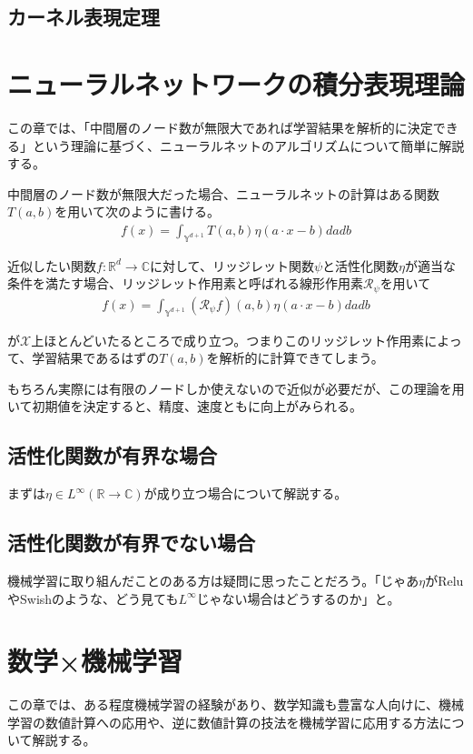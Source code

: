 \documentclass[dvipdfmx, a4paper]{jsarticle}
\begin{document}
\subsection{カーネル表現定理}





\newpage
\section{ニューラルネットワークの積分表現理論}
この章では、「中間層のノード数が無限大であれば学習結果を解析的に決定できる」という理論に基づく、ニューラルネットのアルゴリズムについて簡単に解説する。

中間層のノード数が無限大だった場合、ニューラルネットの計算はある関数$T(a,b)$を用いて次のように書ける。
\begin{align}
f(x)=\int_{\mathbb{Y}^{d+1}}T(a,b)\eta(a\cdot x-b)dadb 
\end{align}

近似したい関数$f:\mathbb{R}^d\to\mathbb{C}$に対して、リッジレット関数$\psi$と活性化関数$\eta$が適当な条件を満たす場合、リッジレット作用素と呼ばれる線形作用素$\mathcal{R}_\psi$を用いて
\begin{align}
f(x)=\int_{\mathbb{Y}^{d+1}}(\mathcal{R}_\psi f)(a,b)\eta(a\cdot x-b)dadb
\end{align}

が$\mathcal{X}$上ほとんどいたるところで成り立つ。つまりこのリッジレット作用素によって、学習結果であるはずの$T(a,b)$を解析的に計算できてしまう。

もちろん実際には有限のノードしか使えないので近似が必要だが、この理論を用いて初期値を決定すると、精度、速度ともに向上がみられる。

\subsection{活性化関数が有界な場合}
まずは$\eta\in L^\infty(\mathbb{R}\to\mathbb{C})$が成り立つ場合について解説する。


\subsection{活性化関数が有界でない場合}
機械学習に取り組んだことのある方は疑問に思ったことだろう。「じゃあ$\eta$がReluやSwishのような、どう見ても$L^\infty$じゃない場合はどうするのか」と。


\newpage
\section{数学×機械学習}
この章では、ある程度機械学習の経験があり、数学知識も豊富な人向けに、機械学習の数値計算への応用や、逆に数値計算の技法を機械学習に応用する方法について解説する。
\end{document}
